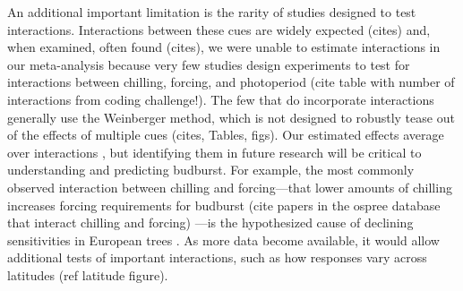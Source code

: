 \documentclass{article}
\begin{document}



\par An additional important limitation is the rarity of studies designed to test interactions. Interactions between these cues are widely expected (cites) and, when examined, often found (cites), we were unable to estimate interactions in our meta-analysis because very few studies design experiments to test for interactions between chilling, forcing, and photoperiod (cite table with number of interactions from coding challenge!). The few that do incorporate interactions generally use the Weinberger method, which is not designed to robustly tease out of the effects of multiple cues (cites, Tables, figs).  Our estimated effects average over interactions \citep{gelman2006}, but identifying them in future research will be critical to understanding and predicting budburst. For example, the most commonly observed interaction between chilling and forcing---that lower amounts of chilling increases forcing requirements for budburst %
(cite papers in the ospree database that interact chilling and forcing)
---is the hypothesized cause of declining sensitivities in European trees \citep{fu2015,vitasse}. As more data become available, it would allow additional tests of important interactions, such as how responses vary across latitudes (ref latitude figure). %
\end{document}
